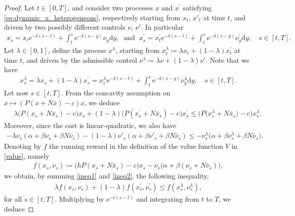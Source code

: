 \documentclass[10pt,a4paper]{amsart}
\def\drm{\mathrm{d}}
\def\erm{\mathrm{e}}
\begin{document}
\begin{proof}
Let $t \in [0,T]$, and consider two processes $x$ and $x^\prime$ satisfying \eqref{eq:dynamic_x_heterogeneous}, respectively starting from $x_t$, $x'_t$ at time $t$, and driven by two possibly different controls $\nu$, $\nu'$. In particular
\begin{align*}
    x_s=x_t \erm^{-\delta(s-t)}+\int_{t}^{s} \erm^{-\delta(s-y)}\nu_y \drm y, \;
    \text{ and } \;
    x^\prime_s=x^\prime_t \erm^{-\delta(s-t)}+\int_{t}^{s} \erm^{-\delta(s-y)}\nu^\prime_y \drm y, \quad s \in [t,T].
\end{align*}
Let $\lambda \in [0,1]$, define the process $x^\lambda$, starting from $x_t^\lambda \coloneq \lambda x_t + (1-\lambda)x_t^\prime$ at time $t$, and driven by the admissible control $\nu^\lambda \coloneq \lambda\nu+(1-\lambda)\nu'$. Note that we have
\begin{align*}
    x_s^\lambda = \lambda x_s + (1-\lambda)x_s^\prime = x^\lambda_t \erm^{-\delta(s-t)}+\int_{t}^{s} \erm^{-\delta(s-y)}\nu^\lambda_y \drm y, \quad s \in [t,T].
\end{align*}
Let now $s \in [t,T]$. From the concavity assumption on $x \longmapsto (P(x+N\bar{x})-c)x$, we deduce
\begin{align}\label{ineq1}
    &\ \lambda \big( P(x_s+N\bar{x}_s)-c \big) x_s + (1-\lambda) \big( P(x^\prime_s+N\bar{x}_s)-c \big) x^\prime_s
    \leq \big( P \big( x_s^\lambda +N\bar{x}_s \big) - c \big) x_s^\lambda.
\end{align}
Moreover, since the cost is linear-quadratic, we also have
\begin{align}\label{ineq2}
    -\lambda\nu_s(\alpha+\beta \nu_s+\beta N \bar{\nu}_s)-(1-\lambda)\nu'_s(\alpha+\beta \nu'_s+\beta N \bar{\nu}_s)
    \leq - \nu^\lambda_s \big( \alpha+\beta \nu^\lambda_s + \beta N \bar{\nu}_s \big).
\end{align}
Denoting by $f$ the running reward in the definition of the value function $V$ in \eqref{value}, namely
\begin{align}\label{running_reward}
    f(x_s, \nu_s) \coloneq \big( h P(x_s + N\bar{x}_s)-c \big) x_s - \nu_s \big( \alpha+\beta(\nu_s+N\bar{\nu}_s) \big),
\end{align}
we obtain, by summing \eqref{ineq1} and \eqref{ineq2}, the following inequality, 
\begin{align*}
    \lambda f(x_s, \nu_s) + (1-\lambda) f(x^\prime_s, \nu^\prime_s)
    \leq f(x^\lambda_s, \nu^\lambda_s),
\end{align*}
for all $s \in [t,T]$. Multiplying by $\erm^{-r(s-t)}$ and integrating from $t$ to $T$, we deduce

\end{proof}
\end{document}
